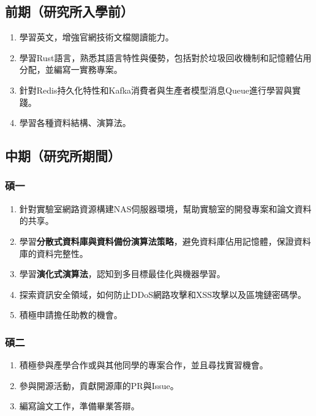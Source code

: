 \documentclass[classical]{einfart}
\providecommand{\tightlist}{%
  \setlength{\itemsep}{0pt}\setlength{\parskip}{0pt}}
\begin{document}
\subsection{前期（研究所入學前）}

\begin{enumerate}
  \def\labelenumi{\arabic{enumi}.}
  \tightlist
  \item
    學習英文，增強官網技術文檔閱讀能力。
  \item
    學習Rust語言，熟悉其語言特性與優勢，包括對於垃圾回收機制和記憶體佔用分配，並編寫一實務專案。
  \item
    針對Redis持久化特性和Kafka消費者與生產者模型消息Queue進行學習與實踐。
  \item
    學習各種資料結構、演算法。
\end{enumerate}

\subsection{中期（研究所期間）}

\subsubsection{碩一}

\begin{enumerate}
  \def\labelenumi{\arabic{enumi}.}
  \tightlist
  \item
    針對實驗室網路資源構建NAS伺服器環境，幫助實驗室的開發專案和論文資料的共享。
  \item
    學習\textbf{分散式資料庫與資料備份演算法策略}，避免資料庫佔用記憶體，保證資料庫的資料完整性。
  \item 
    學習\textbf{演化式演算法}，認知到多目標最佳化與機器學習。
  \item
    探索資訊安全領域，如何防止DDoS網路攻擊和XSS攻擊以及區塊鏈密碼學。
  \item 
    積極申請擔任助教的機會。
\end{enumerate}

\subsubsection{碩二}

\begin{enumerate}
  \def\labelenumi{\arabic{enumi}.}
  \tightlist
  \item
    積極參與產學合作或與其他同學的專案合作，並且尋找實習機會。
  \item
    參與開源活動，貢獻開源庫的PR與Issue。
  \item
    編寫論文工作，準備畢業答辯。
\end{enumerate}
\end{document}
